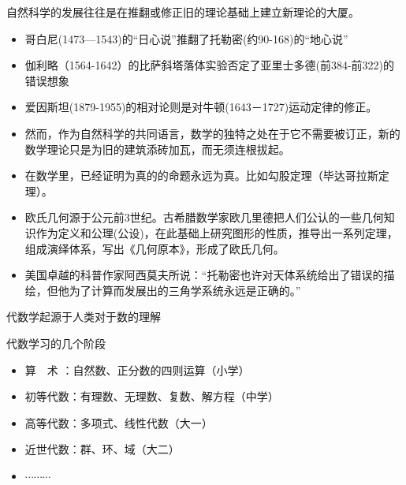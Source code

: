\documentclass[13pt,punct]{ctexbeamer}
\begin{document}
\begin{frame}
	自然科学的发展往往是在推翻或修正旧的理论基础上建立新理论的大厦。
	\begin{itemize}
		\item 哥白尼(1473—1543)的``日心说''推翻了托勒密(约90-168)的``地心说''
		\item 伽利略（1564-1642）的比萨斜塔落体实验否定了亚里士多德(前384-前322)的错误想象
		\item 爱因斯坦(1879-1955)的相对论则是对牛顿(1643－1727)运动定律的修正。
	\end{itemize}
\end{frame}



		\begin{frame}
	\begin{itemize}
		\item 然而，作为自然科学的共同语言，数学的独特之处在于它不需要被订正，新的数学理论只是为旧的建筑添砖加瓦，而无须连根拔起。
		\item 在数学里，已经证明为真的的命题永远为真。比如勾股定理（毕达哥拉斯定理）。
		\item 欧氏几何源于公元前3世纪。古希腊数学家欧几里德把人们公认的一些几何知识作为定义和公理(公设)，在此基础上研究图形的性质，推导出一系列定理，组成演绎体系，写出《几何原本》，形成了欧氏几何。
		\item 美国卓越的科普作家阿西莫夫所说：“托勒密也许对天体系统给出了错误的描绘，但他为了计算而发展出的三角学系统永远是正确的。”
	\end{itemize}
\end{frame}

\begin{frame}
	代数学起源于人类对于数的理解

	\vspace{6pt}

	代数学习的几个阶段
	\begin{itemize}
		\item 算~~术 ：自然数、正分数的四则运算（小学）
		\item 初等代数：有理数、无理数、复数、解方程（中学）
		\item 高等代数：多项式、线性代数（大一）
		\item 近世代数：群、环、域（大二）
		\item $\cdots \cdots\cdots$
	\end{itemize}
\end{frame}
\end{document}
